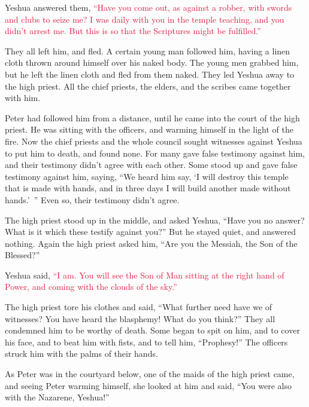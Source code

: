 \myverse{}Yeshua answered them,
\textcolor{crimson}{“Have you come out, as against a robber, with swords and clubs to seize me?
}
\myverse{}\textcolor{crimson}{I was daily with you in the temple teaching, and you didn’t arrest me.
	But this is so that the Scriptures might be fulfilled.”}

\myverse{}They all left him, and fled.
\myverse{}A certain young man followed him, having a linen cloth thrown around himself
over his naked body. The young men grabbed him,
\myverse{}but he left the linen cloth and fled from them naked.
\myverse{}They led Yeshua away to the high priest. All the chief priests, the elders,
and the scribes came together with him.

\myverse{}Peter had followed him from a distance, until he came into the
court of the high priest. He was sitting with the officers, and warming himself in the light of the fire.
\myverse{}Now the chief priests and the whole council sought witnesses against Yeshua
to put him to death, and found none.
\myverse{}For many gave false testimony against him, and their testimony didn’t agree
with each other.
\myverse{}Some stood up and gave false testimony against him, saying,
\myverse{}“We heard him say, ‘I will destroy this temple that is made with hands, and
in three days I will build another made without hands.’ ”
\myverse{}Even so, their testimony didn’t agree.

\myverse{}The high priest stood up in the middle, and asked Yeshua, “Have
you no answer? What is it which these testify against you?”
\myverse{}But he stayed quiet, and answered nothing. Again the high priest asked him,
“Are you the Messiah, the Son of the Blessed?”

\myverse{}Yeshua said,
\textcolor{crimson}{“I am. You will see the Son of Man sitting at the right hand of Power, and coming with the clouds
	of the sky.”}

\myverse{}The high priest tore his clothes and said, “What further need
have we of witnesses?
\myverse{}You have heard the blasphemy! What do you think?” They all condemned him
to be worthy of death.
\myverse{}Some began to spit on him, and to cover his face, and to beat him with fists,
and to tell him, “Prophesy!” The officers struck him with the palms of their hands.

\myverse{}As Peter was in the courtyard below, one of the maids of the
high priest came,
\myverse{}and seeing Peter warming himself, she looked at him and said, “You were also
with the Nazarene, Yeshua!”

